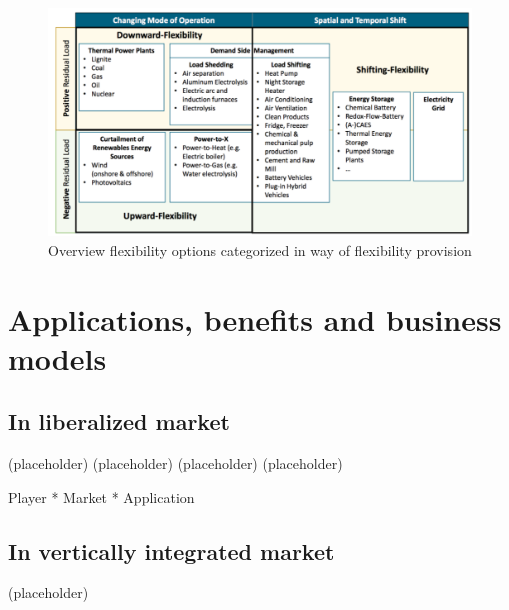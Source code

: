 \begin{figure}[h!]
	\centering
	\includegraphics[width=0.95\linewidth]{Figures/TechnologyOptions}
	\caption{Overview flexibility options categorized in way of flexibility provision \cite{Muller2016}}
	\label{fig:TechnologyOptions}
\end{figure}

\section{Applications, benefits and business models}
\subsection{In liberalized market}


(placeholder)
\newpage
(placeholder)
\newpage
(placeholder)
\newpage
(placeholder)
\newpage


Player * Market * Application





\subsection{In vertically integrated market}
(placeholder)
\newpage


